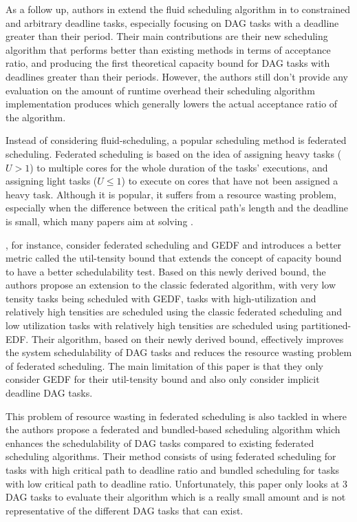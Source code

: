 As a follow up, authors in \cite{GuanFluidDag2022} 
extend the fluid scheduling algorithm in \cite{guan2021DAGfluid}
to constrained and arbitrary deadline tasks,
especially focusing on DAG tasks with a deadline greater than their period.
Their main contributions are their new scheduling algorithm that 
performs better than existing methods in terms of acceptance ratio,
and producing the first theoretical capacity bound for DAG tasks
with deadlines greater than their periods.
However, the authors still don't provide any evaluation 
on the amount of runtime overhead their scheduling algorithm implementation
produces which generally lowers the actual acceptance ratio
of the algorithm. 

Instead of considering fluid-scheduling,
a popular scheduling method is federated scheduling.
Federated scheduling is based on the idea
of assigning heavy tasks ($U > 1$) to multiple cores
for the whole duration of the tasks' executions,
and assigning light tasks ($U \le 1$) to execute on
cores that have not been assigned a heavy task.
Although it is popular, it suffers from a resource wasting problem,
especially when the difference between the critical path's length 
and the deadline is small,
which many papers aim at solving
\cite{Guan2023FederatedNew}
\cite{jiangUtilTensityBound}
\cite{JiangVirtuallyFederatedSched2021}
\cite{Jiang2023SchedVirtualProcs}
\cite{Kobayashi2023FedBundledDagsched}
\cite{Shi2024DagExecGroups}
\cite{He2023DegreeOfParallelism}.

\cite{jiangUtilTensityBound}, for instance, 
consider federated scheduling and GEDF
and introduces a better metric called the util-tensity bound
that extends the concept of capacity bound
to have a better schedulability test.
Based on this newly derived bound, the authors 
propose an extension to the classic federated algorithm,
with very low tensity tasks being scheduled with GEDF, 
tasks with high-utilization and relatively high tensities are scheduled
using the classic federated scheduling and low utilization
tasks with relatively high tensities are scheduled using partitioned-EDF.
Their algorithm, based on their newly derived bound, effectively improves
the system schedulability of DAG tasks and reduces the resource wasting 
problem of federated scheduling. The main limitation
of this paper is that they only consider GEDF 
for their util-tensity bound and also only consider implicit deadline DAG tasks.

This problem of resource wasting in federated scheduling
is also tackled in \cite{Kobayashi2023FedBundledDagsched}
where the authors propose a federated and bundled-based scheduling
algorithm which enhances the schedulability of DAG tasks
compared to existing federated scheduling algorithms.
Their method consists of using federated scheduling for
tasks with high critical path to deadline ratio and bundled
scheduling for tasks with low critical path to deadline ratio.
Unfortunately, this paper only looks at 3 DAG tasks to evaluate
their algorithm which is a really small amount and is not 
representative of the different DAG tasks that can exist.

